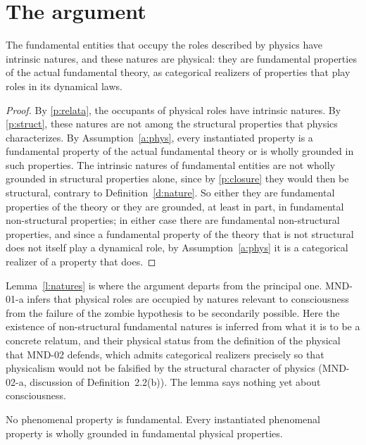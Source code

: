 \documentclass{situationist-preprint}
\begin{document}
\section{The argument}\label{s:arg}

\begin{lemma}\label{l:natures}
The fundamental entities that occupy the roles described by physics have intrinsic natures, and these natures are physical: they are fundamental properties of the actual fundamental theory, as categorical realizers of properties that play roles in its dynamical laws.
\end{lemma}

\begin{proof}
By \ref{p:relata}, the occupants of physical roles have intrinsic natures. By \ref{p:struct}, these natures are not among the structural properties that physics characterizes. By Assumption~\ref{a:phys}, every instantiated property is a fundamental property of the actual fundamental theory or is wholly grounded in such properties. The intrinsic natures of fundamental entities are not wholly grounded in structural properties alone, since by \ref{p:closure} they would then be structural, contrary to Definition~\ref{d:nature}. So either they are fundamental properties of the theory or they are grounded, at least in part, in fundamental non-structural properties; in either case there are fundamental non-structural properties, and since a fundamental property of the theory that is not structural does not itself play a dynamical role, by Assumption~\ref{a:phys} it is a categorical realizer of a property that does.
\end{proof}

Lemma~\ref{l:natures} is where the argument departs from the principal one. MND-01-a infers that physical roles are occupied by natures relevant to consciousness from the failure of the zombie hypothesis to be secondarily possible. Here the existence of non-structural fundamental natures is inferred from what it is to be a concrete relatum, and their physical status from the definition of the physical that MND-02 defends, which admits categorical realizers precisely so that physicalism would not be falsified by the structural character of physics (MND-02-a, discussion of Definition~2.2(b)). The lemma says nothing yet about consciousness.

\begin{lemma}\label{l:notfund}
No phenomenal property is fundamental. Every instantiated phenomenal property is wholly grounded in fundamental physical properties.
\end{lemma}
\end{document}
